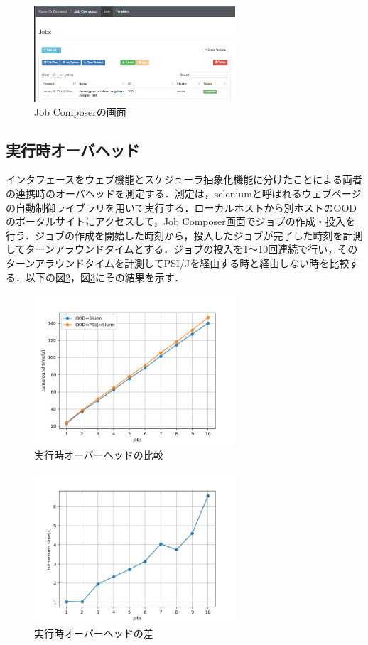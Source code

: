 \documentclass[a4paper,oneside,twocolumn,notitlepage,dvipdfmx]{jsarticle}
\begin{document}
\begin{figure}[h]
  \centering
  \includegraphics[width=75mm]{./fig/jobcomposer.png}
  \caption{Job Composerの画面}
  \label{fig4}
\end{figure}

\subsection{実行時オーバヘッド}
インタフェースをウェブ機能とスケジューラ抽象化機能に分けたことによる両者の連携時のオーバヘッドを測定する．測定は，seleniumと呼ばれるウェブページの自動制御ライブラリを用いて実行する．ローカルホストから別ホストのOODのポータルサイトにアクセスして，Job Composer画面でジョブの作成・投入を行う．ジョブの作成を開始した時刻から，投入したジョブが完了した時刻を計測してターンアラウンドタイムとする．ジョブの投入を1～10回連続で行い，そのターンアラウンドタイムを計測してPSI/Jを経由する時と経由しない時を比較する．以下の図\ref{fig2}，図\ref{fig3}にその結果を示す．\par

\begin{figure}[h]
  \centering
  \includegraphics[width=75mm]{./fig/ave_1-20.png}
  \caption{実行時オーバーヘッドの比較}
  \label{fig2}
\end{figure}

\begin{figure}[h]
  \centering
  \includegraphics[width=75mm]{./fig/ave_diff_1-20.png}
  \caption{実行時オーバーヘッドの差}
  \label{fig3}
\end{figure}
\end{document}
